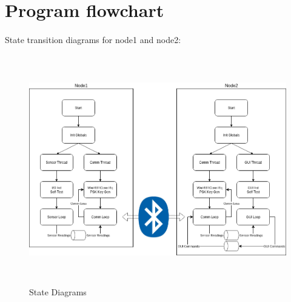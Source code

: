\section{Program flowchart}
\label{chapter3}


\paragraph{}
State transition diagrams for node1 and node2:

\begin{figure}[h]
	\includegraphics[height=100mm]{images/StateDiagrams}
	\centering
	\caption{State Diagrams}
	\label{fig:stateDiagrams}
\end{figure}